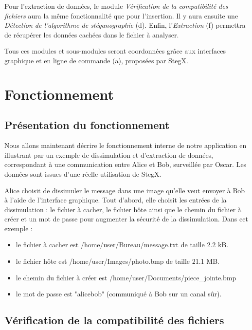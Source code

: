 \documentclass[11pt]{article}
\begin{document}
Pour l'extraction de données, le module \textit{Vérification de la compatibilité 
des fichiers} aura la même fonctionnalité que pour l'insertion.
Il y aura ensuite une \textit{Détection de l'algorithme de stéganographie} 
(d). 
Enfin, l'\textit{Extraction} (f) permettra de récupérer les données cachées 
dans le fichier à analyser. 

Tous ces modules et sous-modules seront coordonnées grâce aux interfaces 
graphique et en ligne de commande (a), proposées par StegX. 

\section{Fonctionnement}

\subsection{Présentation du fonctionnement}

Nous allons maintenant décrire le fonctionnement interne de notre
application en illustrant par un exemple de dissimulation et d'extraction 
de données, correspondant à une communication entre Alice et Bob, surveillée 
par Oscar. Les données sont issues d'une réelle utilisation de StegX. 

Alice choisit de dissimuler le message dans une image qu'elle veut envoyer 
à Bob à l'aide de l'interface graphique. 
Tout d'abord, elle choisit les entrées de la dissimulation : le fichier 
à cacher, le fichier hôte ainsi que le chemin du fichier à créer et un mot 
de passe pour augmenter la sécurité de la dissimulation. \newline
Dans cet exemple : 
\begin{itemize}
\item le fichier à cacher est /home/user/Bureau/message.txt de taille 2.2 kB. 
\item le fichier hôte est /home/user/Images/photo.bmp de taille 21.1 MB. 
\item le chemin du fichier à créer est /home/user/Documents/piece\_jointe.bmp
\item le mot de passe est "alicebob" (communiqué à Bob sur un canal sûr).
\end{itemize}

\subsection{Vérification de la compatibilité des fichiers}
\end{document}
